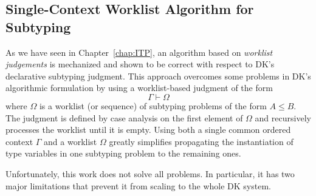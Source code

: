 % 
% 
% 
\subsection{Single-Context Worklist Algorithm for Subtyping}

As we have seen in Chapter~\ref{chap:ITP},
an algorithm based on \emph{worklist judgements} is mechanized
and shown to be correct with respect to DK's declarative
subtyping judgment.
This approach overcomes some problems in DK's algorithmic formulation
by using a worklist-based judgment of the form $$\Gamma \vdash \Omega$$
where $\Omega$ is a worklist (or sequence) of subtyping problems of the
form $A \leq B$.  The judgment is defined by case analysis on the first
element of $\Omega$ and recursively processes the worklist until it is empty.
Using both a single common ordered context $\Gamma$ and a worklist $\Omega$ greatly
simplifies propagating the instantiation of type variables in one
subtyping problem to the remaining ones.

Unfortunately, this work does not solve all problems. In particular, it has two
major limitations that prevent it from scaling to the whole DK system. 

